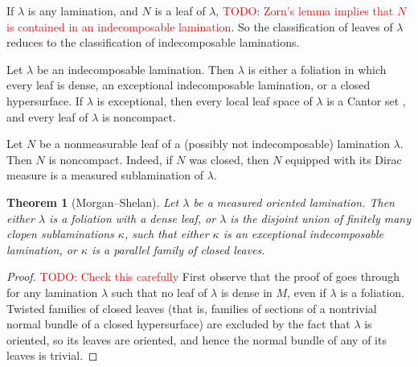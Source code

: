\documentclass[reqno,11pt]{amsart}
\newtheorem{theorem}{Theorem}[section]
\theoremstyle{definition}
\numberwithin{equation}{section}
\newcommand\todo[1]{\textcolor{red}{TODO: #1}}
\begin{document}
If $\lambda$ is any lamination, and $N$ is a leaf of $\lambda$, \todo{Zorn's lemma implies that $N$ is contained in an indecomposable lamination}.
So the classification of leaves of $\lambda$ reduces to the classification of indecomposable laminations.

Let $\lambda$ be an indecomposable lamination.
Then $\lambda$ is either a foliation in which every leaf is dense, an exceptional indecomposable lamination, or a closed hypersurface.
If $\lambda$ is exceptional, then every local leaf space of $\lambda$ is a Cantor set \cite[{\S}I.3.1]{Morgan88}, and every leaf of $\lambda$ is noncompact.

Let $N$ be a nonmeasurable leaf of a (possibly not indecomposable) lamination $\lambda$.
Then $N$ is noncompact.
Indeed, if $N$ was closed, then $N$ equipped with its Dirac measure is a measured sublamination of $\lambda$.

\begin{theorem}[Morgan--Shelan]\label{MorganShelan}
Let $\lambda$ be a measured oriented lamination.
Then either $\lambda$ is a foliation with a dense leaf, or $\lambda$ is the disjoint union of finitely many clopen sublaminations $\kappa$, such that either $\kappa$ is an exceptional indecomposable lamination, or $\kappa$ is a parallel family of closed leaves.
\end{theorem}
\begin{proof}
  \todo{Check this carefully}
First observe that the proof of \cite[Theorem I.3.2]{Morgan88} goes through for any lamination $\lambda$ such that no leaf of $\lambda$ is dense in $M$, even if $\lambda$ is a foliation.
Twisted families of closed leaves (that is, families of sections of a nontrivial normal bundle of a closed hypersurface) are excluded by the fact that $\lambda$ is oriented, so its leaves are oriented, and hence the normal bundle of any of its leaves is trivial.
\end{proof}
\end{document}
